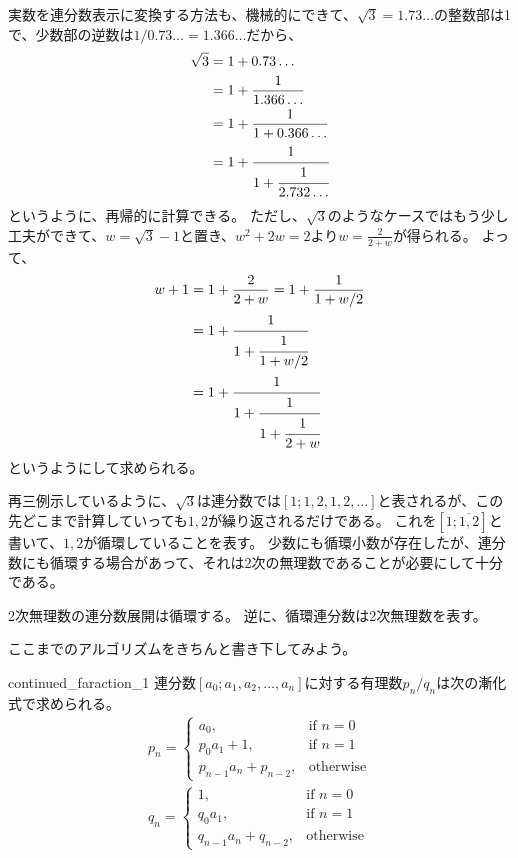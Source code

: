 実数を連分数表示に変換する方法も、機械的にできて、$\sqrt{3}=1.73\ldots$の整数部は1で、少数部の逆数は$1/0.73\ldots=1.366\ldots$だから、
\begin{align*}
\sqrt{3} &= 1 + 0.73\ldots\\
&= 1 + \frac{1}{1.366\ldots}\\
&= 1 + \frac{1}{1 + 0.366\ldots}\\
&= 1 + \cfrac{1}{1 + \cfrac{1}{2.732\ldots}}
\end{align*}
というように、再帰的に計算できる。
ただし、$\sqrt{3}$のようなケースではもう少し工夫ができて、$w=\sqrt{3}-1$と置き、$w^2+2w=2$より$w=\frac{2}{2+w}$が得られる。
よって、
\begin{align*}
w + 1 &= 1 + \frac{2}{2+w} = 1 + \frac{1}{1 + w/2}\\
&= 1 + \cfrac{1}{1 + \cfrac{1}{1 + w/2}}\\
&= 1 + \cfrac{1}{1 + \cfrac{1}{1 + \cfrac{1}{2+w}}}
\end{align*}
というようにして求められる。

再三例示しているように、$\sqrt{3}$は連分数では$[1;1,2,1,2,\ldots]$と表されるが、この先どこまで計算していっても$1,2$が繰り返されるだけである。
これを$[1;\overline{1,2}]$と書いて、$1,2$が循環していることを表す。
少数にも循環小数が存在したが、連分数にも循環する場合があって、それは2次の無理数であることが必要にして十分である。

\begin{Prop}{}{}
2次無理数の連分数展開は循環する。
逆に、循環連分数は2次無理数を表す。
\end{Prop}

ここまでのアルゴリズムをきちんと書き下してみよう。

\begin{Prop}{}{continued_faraction_1}
連分数$[a_0;a_1,a_2,\ldots,a_n]$に対する有理数$p_n/q_n$は次の漸化式で求められる。
\begin{align*}
p_n = 
\begin{cases}
a_0, &\mbox{if } n = 0\\
p_0a_1 + 1, &\mbox{if } n = 1\\
p_{n-1}a_n + p_{n-2}, &\mbox{otherwise}
\end{cases}
\\
q_n = 
\begin{cases}
1, &\mbox{if } n = 0\\
q_0a_1, &\mbox{if } n = 1\\
q_{n-1}a_n + q_{n-2}, &\mbox{otherwise}
\end{cases}
\end{align*}
\end{Prop}

